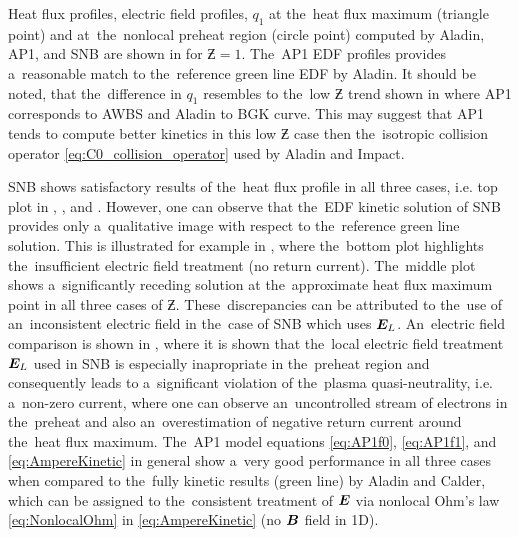 Heat flux profiles, electric field profiles, $q_1$ at the~heat flux maximum 
(triangle point) and at~the~nonlocal preheat region (circle point) 
computed by Aladin, AP1, and SNB are shown in  
for $\Zbar = 1$. The~AP1 EDF profiles provides a~reasonable match to 
the~reference green line EDF by Aladin. It should be noted, 
that the~difference in $q_1$ resembles to the~low $\Zbar$ trend
shown in  where AP1 corresponds to AWBS and Aladin to
BGK curve. This may suggest that AP1 tends 
to compute better kinetics in this low $\Zbar$ case then 
the~isotropic collision operator
\eqref{eq:C0_collision_operator} used by Aladin and Impact.


SNB shows satisfactory results of the~heat flux profile in all three cases, 
i.e. top plot in , , 
and . However, one can observe that the~EDF 
kinetic solution of SNB provides only a~qualitative image with respect to
the~reference green line solution. This is illustrated for example in
, where the~bottom plot highlights the~insufficient
electric field treatment (no return current). The~middle plot
shows a~significantly receding solution at the~approximate heat flux maximum
point in all three cases of $\Zbar$. 
These~discrepancies can be attributed to the~use of an~inconsistent 
electric field in the~case of SNB which uses $\boldsymbol{E}_L$. An~electric field 
comparison is shown in , where it is shown that 
the~local electric field treatment $\boldsymbol{E}_L$ used in SNB is especially 
inapropriate in the~preheat region and consequently leads to 
a~significant violation of the~plasma quasi-neutrality,
i.e. a~non-zero current, where one can observe an~uncontrolled stream of 
electrons in the~preheat and also an~overestimation of negative return current
around the~heat flux maximum.
The~AP1 model equations \eqref{eq:AP1f0}, \eqref{eq:AP1f1}, 
and \eqref{eq:AmpereKinetic} in general show a~very good performance 
in all three cases when compared to the~fully kinetic results 
(green line) by Aladin and Calder, which can be assigned to the~consistent 
treatment of $\boldsymbol{E}$ via nonlocal Ohm's law \eqref{eq:NonlocalOhm} in
 \eqref{eq:AmpereKinetic} (no $\boldsymbol{B}$ field in 1D).

